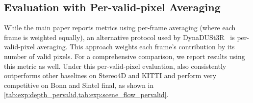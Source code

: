 \begin{table}[!ht]
\centering
\scriptsize
\setlength\tabcolsep{6pt}
\caption{\textbf{Motion estimation (under per-valid-pixel averaging protocol)} We evaluate the scene flow accuracy on the Stereo4D test split \citep{Jin:2025:S4D} and KITTI Scene Flow 2015 Training \citep{Menze:2018:OSF}. Our approach consistently outperforms others on all metrics.}
\label{tab:exp:scene_flow_pervalid}
\end{table}



\subsection{Evaluation with Per-valid-pixel Averaging}

While the main paper reports metrics using per-frame averaging (where each frame is weighted equally), an alternative protocol used by DynaDUSt3R~\citep{Jin:2025:S4D} is per-valid-pixel averaging. This approach weights each frame's contribution by its number of valid pixels. For a comprehensive comparison, we report results using this metric as well. Under this per-valid-pixel evaluation, \ourmethod{} also consistently outperforms other baselines on Stereo4D and KITTI and perform very competitive on Bonn and Sintel final, as shown in \cref{tab:exp:depth_pervalid,tab:exp:scene_flow_pervalid}.





